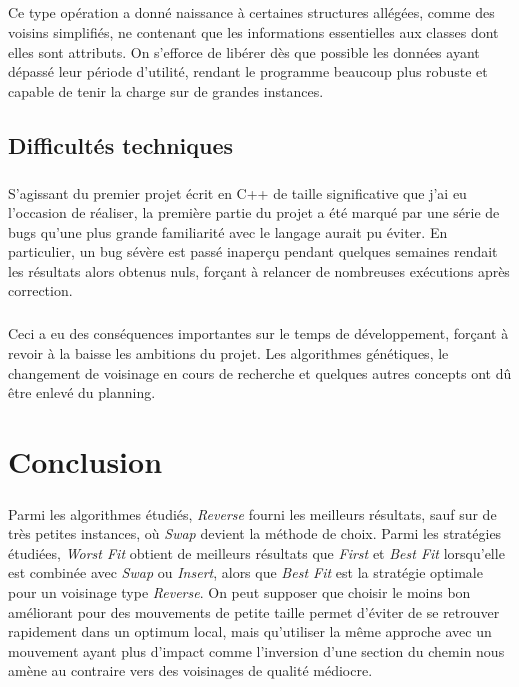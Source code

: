\documentclass[a4paper,10pt]{report}
\begin{document}
\paragraph{}
  Ce type opération a donné naissance à certaines structures allégées, comme des
voisins simplifiés, ne contenant que les informations essentielles aux classes
dont elles sont attributs. On s'efforce de libérer dès que possible les données
ayant dépassé leur période d'utilité, rendant le programme beaucoup plus robuste
et capable de tenir la charge sur de grandes instances.


\section{Difficultés techniques}

\paragraph{}
  S'agissant du premier projet écrit en C++ de taille significative que j'ai eu
l'occasion de réaliser, la première partie du projet a été marqué par une série
de bugs qu'une plus grande familiarité avec le langage aurait pu éviter. En
particulier, un bug sévère est passé inaperçu pendant quelques semaines rendait
les résultats alors obtenus nuls, forçant à relancer de nombreuses exécutions
après correction.

\paragraph{}
  Ceci a eu des conséquences importantes sur le temps de développement, forçant
à revoir à la baisse les ambitions du projet. Les algorithmes génétiques, le
changement de voisinage en cours de recherche et quelques autres concepts ont dû
être enlevé du planning.


\chapter*{Conclusion}

\paragraph{} %
Parmi les algorithmes étudiés, \textit{Reverse} fourni les meilleurs résultats,
sauf sur de très petites instances, où \textit{Swap} devient la méthode de
choix. Parmi les stratégies étudiées, \textit{Worst Fit} obtient de meilleurs
résultats que \textit{First} et \textit{Best Fit} lorsqu'elle est combinée avec
\textit{Swap} ou \textit{Insert}, alors que \textit{Best Fit} est la stratégie
optimale pour un voisinage type \textit{Reverse}. On peut supposer que choisir
le moins bon améliorant pour des mouvements de petite taille permet d'éviter de
se retrouver rapidement dans un optimum local, mais qu'utiliser la même approche
avec un mouvement ayant plus d'impact comme l'inversion d'une section du chemin
nous amène au contraire vers des voisinages de qualité médiocre.
\end{document}
